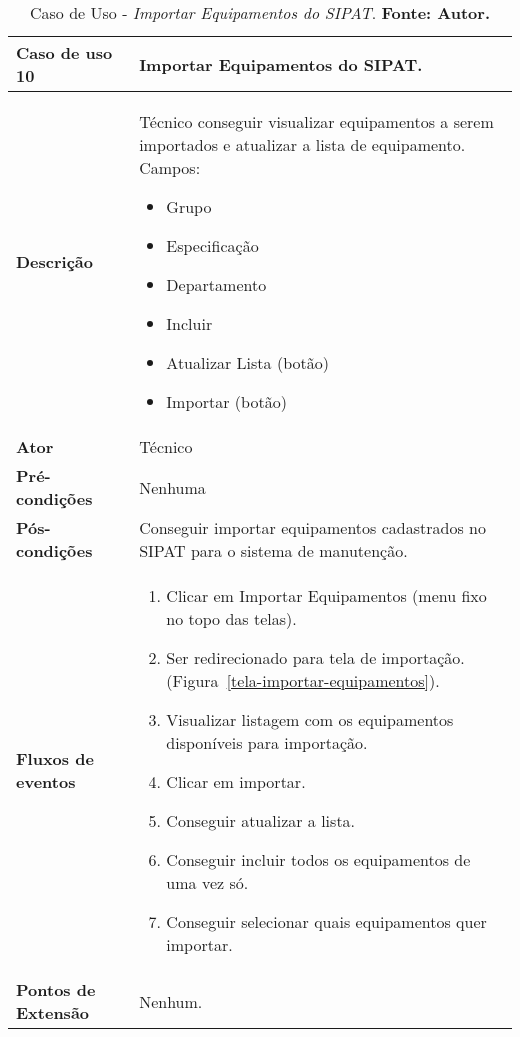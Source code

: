 \begin{apendicesenv}

\begin{table}[H]
\centering
\caption{Caso de Uso - \textit{Importar Equipamentos do SIPAT}. \textbf{Fonte: Autor.}}
\label{uc10}
\begin{tabular}{ | p{5cm} | p{10cm} |  }
\hline
	\textbf{Caso de uso 10} & Importar Equipamentos do SIPAT. \\ \hline
	\textbf{Descrição} & Técnico conseguir visualizar equipamentos a serem importados e atualizar a lista de equipamento. Campos: \begin{itemize}
															                    \item Grupo
															                    \item Especificação
															                    \item Departamento
															                    \item Incluir 
															                    \item Atualizar Lista (botão)
															                    \item Importar (botão)
															                    \end{itemize} \\ \hline
	\textbf{Ator} & Técnico \\ \hline
	\textbf{Pré-condições} & Nenhuma \\ \hline
	\textbf{Pós-condições} & Conseguir importar equipamentos cadastrados no SIPAT para o sistema de manutenção. \\ \hline
	\textbf{Fluxos de eventos} & \begin{enumerate}
									\item Clicar em Importar Equipamentos (menu fixo no topo das telas).    
									\item Ser redirecionado para tela de importação. (Figura~\ref{tela-importar-equipamentos}).
									\item Visualizar listagem com os equipamentos disponíveis para importação.
									\item Clicar em importar.
									\item Conseguir atualizar a lista.
									\item Conseguir incluir todos os equipamentos de uma vez só.
									\item Conseguir selecionar quais equipamentos quer importar.
								 \end{enumerate}   \\ \hline
	\textbf{Pontos de Extensão} & Nenhum. \\ \hline
\end{tabular}
\end{table}


\end{apendicesenv}
